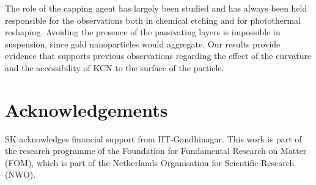 \documentclass[twoside,twocolumn,11pt]{article}
\begin{document}
The role of the capping agent has largely been studied and has always been
held responsible for the observations both in chemical etching\cite{Yuan2015}
and for photothermal reshaping\cite{Horiguchi2008}. Avoiding the presence of
the passivating layers is impossible in suspension, since gold nanoparticles
would aggregate. Our results provide evidence that supports previous
observations regarding the effect of the curvature and the accessibility of
KCN to the surface of the particle.

\section{Acknowledgements}
SK acknowledges financial support from IIT-Gandhinagar. This work is part of the
research programme of the Foundation for Fundamental Research on Matter (FOM),
which is part of the Netherlands Organisation for Scientific Research (NWO).




\end{document}
